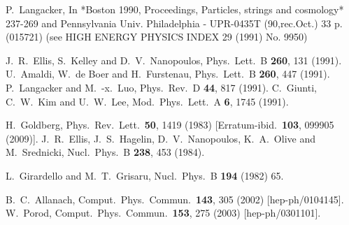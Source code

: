 \documentclass[final,3p,times,pdflatex]{elsarticle}
\begin{document}
\begin{thebibliography}{100}
  P.~Langacker,
  In *Boston 1990, Proceedings, Particles, strings and cosmology* 237-269 and Pennsylvania Univ. Philadelphia - UPR-0435T (90,rec.Oct.) 33 p. (015721) (see HIGH ENERGY PHYSICS INDEX 29 (1991) No. 9950)

  J.~R.~Ellis, S.~Kelley and D.~V.~Nanopoulos,
  Phys.\ Lett.\ B {\bf 260}, 131 (1991).
  U.~Amaldi, W.~de Boer and H.~Furstenau,
  Phys.\ Lett.\ B {\bf 260}, 447 (1991).
  P.~Langacker and M.~-x.~Luo,
  Phys.\ Rev.\ D {\bf 44}, 817 (1991).
  C.~Giunti, C.~W.~Kim and U.~W.~Lee,
  Mod.\ Phys.\ Lett.\ A {\bf 6}, 1745 (1991).


  H.~Goldberg,
  Phys.\ Rev.\ Lett.\  {\bf 50}, 1419 (1983)
  [Erratum-ibid.\  {\bf 103}, 099905 (2009)].
  J.~R.~Ellis, J.~S.~Hagelin, D.~V.~Nanopoulos, K.~A.~Olive and M.~Srednicki,
  Nucl.\ Phys.\ B {\bf 238}, 453 (1984).

  L.~Girardello and M.~T.~Grisaru,
  Nucl.\ Phys.\ B {\bf 194} (1982) 65.

  B.~C.~Allanach,
  Comput.\ Phys.\ Commun.\  {\bf 143}, 305 (2002)
  [hep-ph/0104145].
  W.~Porod,
  Comput.\ Phys.\ Commun.\  {\bf 153}, 275 (2003)
  [hep-ph/0301101].


\end{thebibliography}
\end{document}
